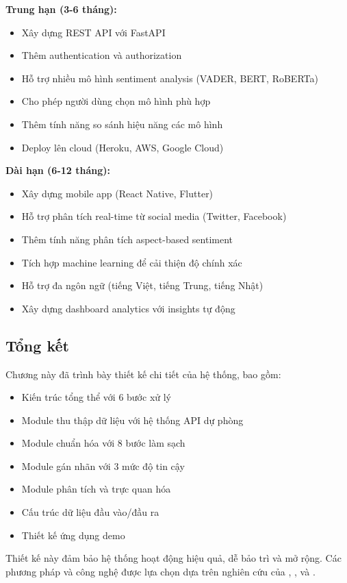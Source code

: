 \textbf{Trung hạn (3-6 tháng):}
\begin{itemize}
    \item Xây dựng REST API với FastAPI
    \item Thêm authentication và authorization
    \item Hỗ trợ nhiều mô hình sentiment analysis (VADER, BERT, RoBERTa)
    \item Cho phép người dùng chọn mô hình phù hợp
    \item Thêm tính năng so sánh hiệu năng các mô hình
    \item Deploy lên cloud (Heroku, AWS, Google Cloud)
\end{itemize}

\textbf{Dài hạn (6-12 tháng):}
\begin{itemize}
    \item Xây dựng mobile app (React Native, Flutter)
    \item Hỗ trợ phân tích real-time từ social media (Twitter, Facebook)
    \item Thêm tính năng phân tích aspect-based sentiment
    \item Tích hợp machine learning để cải thiện độ chính xác
    \item Hỗ trợ đa ngôn ngữ (tiếng Việt, tiếng Trung, tiếng Nhật)
    \item Xây dựng dashboard analytics với insights tự động
\end{itemize}

\subsection{Tổng kết}
Chương này đã trình bày thiết kế chi tiết của hệ thống, bao gồm:

\begin{itemize}
    \item Kiến trúc tổng thể với 6 bước xử lý
    \item Module thu thập dữ liệu với hệ thống API dự phòng
    \item Module chuẩn hóa với 8 bước làm sạch
    \item Module gán nhãn với 3 mức độ tin cậy
    \item Module phân tích và trực quan hóa
    \item Cấu trúc dữ liệu đầu vào/đầu ra
    \item Thiết kế ứng dụng demo
\end{itemize}

Thiết kế này đảm bảo hệ thống hoạt động hiệu quả, dễ bảo trì và mở rộng. Các phương pháp và công nghệ được lựa chọn dựa trên nghiên cứu của \cite{hutto2014vader}, \cite{liu2012sentiment}, và \cite{pang2008opinion}.

